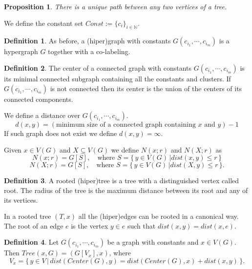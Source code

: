 \documentclass[11pt,notitlepage]{report}
\newtheorem{proposition}{Proposition}[chapter]
\theoremstyle{definition}
\newtheorem{definition}{Definition}[chapter]
\newcommand{\N}{\mathbb{N}}
\newcommand{\clist}{c_{i_1}, \cdots, c_{i_m}}
\begin{document}
\begin{proposition} There is a unique path between any two vertices of a tree. 
\end{proposition}


We define the constant set $Const:=\{c_i\}_{i\in \N}$.

\begin{definition} 
	As before, a (hiper)graph with constants $G(\clist)$ is a hypergraph 
	$G$ together with a co-labeling. 
\end{definition}

\begin{definition}
	The center of a connected graph with constants $G(\clist)$ is its minimal 
	connected subgraph containing all the constants and clusters. If $G(\clist)$
	is not connected then its center is the union of the centers of its connected
	components.   
\end{definition}

We define a distance over $G(\clist)$.
\[ d(x,y)= (\text{minimum size of a connected graph containing }x \text{ and } y) - 1 \]
If such graph does not exist we define $d(x,y)=\infty$.\par

Given $x\in V(G)$ and $X\subseteq V(G)$ we define $N(x;r)$ and $N(X;r)$ as
\[ N(x;r)= G[S], \quad \text{where } S=\{\, y\in V(G) \, | dist(x,y)\leq r \, \} \]
\[ N(X;r)= G[S], \quad \text{where } S=\{\, y\in V(G) \, | dist(X,y)\leq r \, \}. \]

\begin{definition}
	 A rooted (hiper)tree is a tree with a distinguished vertex called root.
	 The radius of the tree is the maximum distance between its root and any
	 of its vertices.  
\end{definition}

In a rooted tree $(T,x)$ all the (hiper)edges can be rooted in a canonical way. 
The root of an edge $e$ is the vertex $y\in e$ such that $dist(x,y)=dist(x,e)$.

\begin{definition}
	Let $G(\clist)$ be a graph with constants and $x\in V(G)$. Then
	$Tree(x,G)=(G[V_x],x)$, where
	\[ V_x= \{\, y\in V \, | \, dist(Center(G),y)= dist(Center(G),x)+ dist(x,y) \,	 \}. \]
\end{definition}
\end{document}
